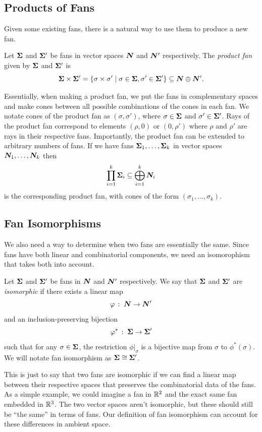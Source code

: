 \documentclass[12pt,oneside]{../../sfsuthesis}
\begin{document}
\subsection{Products of Fans}

Given some existing fans, there is a natural way to use them to produce a new fan.
\begin{definition}\th\label{def:productFan}
    Let \( {\bm{\Sigma}} \) and \( {\bm{\Sigma}}' \) be fans in vector spaces \( \bm{N} \) and \( \bm{N}' \) respectively.
    The \emph{product fan} given by \( {\bm{\Sigma}} \) and \( {\bm{\Sigma}}' \) is
    \[
        {\bm{\Sigma}} \times {\bm{\Sigma}}' = \{ \sigma \times \sigma' \; | \; \sigma \in {\bm{\Sigma}}, \sigma' \in {\bm{\Sigma}}' \} \subseteq \bm{N} \oplus \bm{N}'.
    \]
\end{definition}
Essentially, when making a product fan, we put the fans in complementary spaces and make cones between all possible combinations of the cones in each fan.
We notate cones of the product fan as \( (\sigma, \sigma') \), where \( \sigma \in {\bm{\Sigma}} \) and \(\sigma' \in {\bm{\Sigma}}' \).
Rays of the product fan correspond to elements \( (\rho, 0) \) or \( (0, \rho') \) where \( \rho \) and \( \rho' \) are rays in their respective fans.
Importantly, the product fan can be extended to arbitrary numbers of fans.
If we have fans \( {\bm{\Sigma}}_1, \dots, {\bm{\Sigma}}_k \) in vector spaces \( \bm{N}_1, \dots, \bm{N}_k \) then
\[
    \prod_{i=1}^k {\bm{\Sigma}}_i \subseteq \bigoplus_{i=1}^k \bm{N}_i
\]
is the corresponding product fan, with cones of the form \( (\sigma_1, \dots, \sigma_k) \).

\subsection{Fan Isomorphisms}

We also need a way to determine when two fans are essentially the same.
Since fans have both linear and combinatorial components, we need an isomorophism that takes both into account.

\begin{definition}\th\label{def:fanIsomorphism}
    Let \( {\bm{\Sigma}} \) and \( {\bm{\Sigma}}' \) be fans in \( \bm{N} \) and \( \bm{N}' \) respectively.
    We say that \( {\bm{\Sigma}} \) and \( {\bm{\Sigma}}' \) are \emph{isomorphic} if there exists a linear map
    \[
        \varphi\,:\; \bm{N} \to \bm{N}'
    \]
    and an inclusion-preserving bijection
    \[
        \varphi^\ast \,:\; {\bm{\Sigma}} \to {\bm{\Sigma}}'
    \]
    such that for any \( \sigma \in {\bm{\Sigma}} \), the restriction \( \phi|_\sigma \) is a bijective map from \( \sigma \) to \( \phi^\ast(\sigma) \).
    We will notate fan isomorphism as \( {\bm{\Sigma}} \cong {\bm{\Sigma}}' \).
\end{definition}
This is just to say that two fans are isomorphic if we can find a linear map between their respective spaces that preserves the combinatorial data of the fans.
As a simple example, we could imagine a fan in \( \mathbb{R}^2 \) and the exact same fan embedded in \( \mathbb{R}^3 \).
The two vector spaces aren't isomorphic, but these should still be ``the same'' in terms of fans.
Our definition of fan isomorphism can account for these differences in ambient space.
\end{document}
